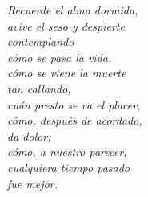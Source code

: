 \newpage
$\ $\\
\vspace{10cm}
\begin{flushright}
	\textit{Recuerde el alma dormida,\\       
	avive el seso y despierte\\
	contemplando\\
	cómo se pasa la vida,\\
	cómo se viene la muerte\\              
	tan callando,\\
	cuán presto se va el placer,\\
	cómo, después de acordado,\\
	da dolor;\\
	cómo, a nuestro parecer,\\
	cualquiera tiempo pasado\\
	fue mejor.\\}
\end{flushright}
\thispagestyle{empty}